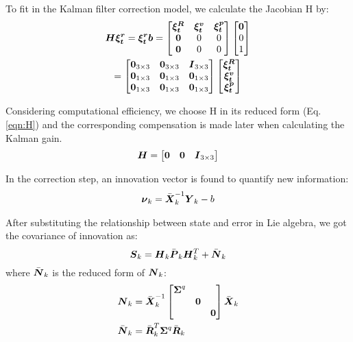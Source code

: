 To fit in the Kalman filter correction model, we calculate the Jacobian H by:
\begin{multline}
    \boldsymbol{H}\boldsymbol{\xi^r_t} = \boldsymbol{\xi^r_t} \boldsymbol{b} = 
    \begin{bmatrix}
       \boldsymbol{\xi^R_t} & \boldsymbol{\xi^{v}_t} & \boldsymbol{\xi^{p}_t}  \\
       \boldsymbol{0}       & 0         & 0 \\
       \boldsymbol{0}       & 0         & 0
    \end{bmatrix}
    \begin{bmatrix}
        \boldsymbol{0} \\
        0 \\
        1
    \end{bmatrix}\\
    =
    \begin{bmatrix}
        \boldsymbol{0}_{3 \times 3} & \boldsymbol{0}_{3 \times 3} & \boldsymbol{I}_{3 \times 3} \\
        \boldsymbol{0}_{1 \times 3} & \boldsymbol{0}_{1 \times 3} & \boldsymbol{0}_{1 \times 3} \\
        \boldsymbol{0}_{1 \times 3} & \boldsymbol{0}_{1 \times 3} & \boldsymbol{0}_{1 \times 3} 
    \end{bmatrix}
    \begin{bmatrix}
         \boldsymbol{\xi^R_t} \\
         \boldsymbol{\xi^v_t} \\
         \boldsymbol{\xi^p_t}
    \end{bmatrix}
\end{multline}

Considering computational efficiency, we choose H in its reduced form (Eq. \ref{eqn:H}) and the corresponding compensation is made later when calculating the Kalman gain.
\begin{equation}
    \label{eqn:H}
    \boldsymbol{H} = 
    \begin{bmatrix}
    \boldsymbol{0} & \boldsymbol{0} & \boldsymbol{I}_{3 \times 3}
    \end{bmatrix}
\end{equation}

In the correction step, an innovation vector is found to quantify new information:  
\begin{align}
    \boldsymbol{\nu}_k = \bar{\boldsymbol{X}}^{-1}_k \boldsymbol{Y}_k - b
\end{align}

After substituting the relationship between state and error in Lie algebra, we got the covariance of innovation as:
\begin{equation}
    \boldsymbol{S}_k=\boldsymbol{H}_k\bar{\boldsymbol{P}}_k\boldsymbol{H}_k^T+\bar{\boldsymbol{N}}_k
\end{equation}
where $\bar{\boldsymbol{N}}_k$ is the reduced form of $\boldsymbol{N}_k$:
\begin{align}
    & \boldsymbol{N}_k=\bar{\boldsymbol{X}}_k^{-1}
    \begin{bmatrix}
    \boldsymbol{\Sigma}^{q} & & \\
    & \boldsymbol{0} & \\
    & & \boldsymbol{0} \\
    \end{bmatrix} 
    \bar{\boldsymbol{X}}_k\\
    & \bar{\boldsymbol{N}}_k=\bar{\boldsymbol{R}}_k^T\boldsymbol{\Sigma}^q\bar{\boldsymbol{R}}_k
\end{align}

